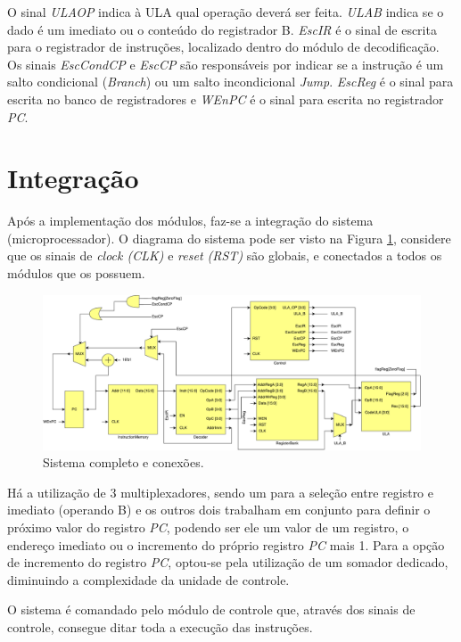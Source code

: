 \documentclass[11pt,a4paper,titlepage]{article}
\begin{document}
O sinal \textit{ULAOP} indica à ULA qual operação deverá ser feita. \textit{ULAB} indica se o dado é um imediato ou o conteúdo do registrador B. \textit{EscIR} é o sinal de escrita para o registrador de instruções, localizado dentro do módulo de decodificação. Os sinais \textit{EscCondCP} e \textit{EscCP} são responsáveis por indicar se a instrução é um salto condicional (\textit{Branch}) ou um salto incondicional \textit{Jump}. \textit{EscReg} é o sinal para escrita no banco de registradores e \textit{WEnPC} é o sinal para escrita no registrador \textit{PC}.

\section{Integração}

Após a implementação dos módulos, faz-se a integração do sistema (microprocessador). O diagrama do sistema pode ser visto na Figura \ref{fig:microprocessor}, considere que os sinais de \textit{clock (CLK)} e \textit{reset (RST)} são globais, e conectados a todos os módulos que os possuem.

\begin{figure}[h]
\centering
\includegraphics[scale=0.4]{images/Microprocessor.pdf}
\caption{Sistema completo e conexões.}
\label{fig:microprocessor}
\end{figure}

Há a utilização de 3 multiplexadores, sendo um para a seleção entre registro e imediato (operando B) e os outros dois trabalham em conjunto para definir o próximo valor do registro \textit{PC}, podendo ser ele um valor de um registro, o endereço imediato ou o incremento do próprio registro \textit{PC} mais 1. Para a opção de incremento do registro \textit{PC}, optou-se pela utilização de um somador dedicado, diminuindo a complexidade da unidade de controle.

O sistema é comandado pelo módulo de controle que, através dos sinais de controle, consegue ditar toda a execução das instruções.
\end{document}
